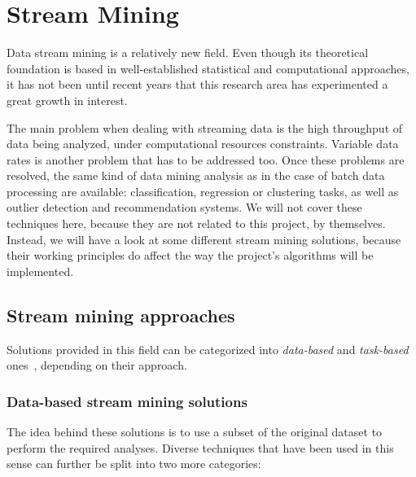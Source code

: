 \section{Stream Mining}
\label{Theory::StreamMining}

Data stream mining is a relatively new field. Even though its theoretical foundation is based in well-established statistical and computational approaches, it has not been until recent years that this research area has experimented a great growth in interest.

The main problem when dealing with streaming data is the high throughput of data being analyzed, under computational resources constraints. Variable data rates is another problem that has to be addressed too. Once these problems are resolved, the same kind of data mining analysis as in the case of batch data processing are available: classification, regression or clustering tasks, as well as outlier detection and recommendation systems. We will not cover these techniques here, because they are not related to this project, by themselves. Instead, we will have a look at some different stream mining solutions, because their working principles do affect the way the project’s algorithms will be implemented.

\subsection{Stream mining approaches}
\label{Theory::StreamMining::Approaches}

Solutions provided in this field can be categorized into \textit{data-based} and \textit{task-based} ones~\citep{Gaber:MiningDataStreamsReview}, depending on their approach.

\subsubsection*{Data-based stream mining solutions}

The idea behind these solutions is to use a subset of the original dataset to perform the required analyses. Diverse techniques that have been used in this sense can further be split into two more categories:

